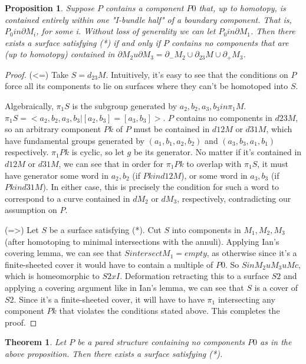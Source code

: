 \documentclass[12pt]{amsart}
\newtheorem{thm}[theorem]{Theorem}
\newtheorem{prop}[theorem]{Proposition}
\theoremstyle{definition}
\newcommand{\bd}{\partial}
\begin{document}
\begin{prop}

Suppose $P$ contains a component $P0$ that, up to homotopy, is
contained entirely within one "I-bundle half" of a boundary component. That is,
$P_0 in \bd M_i$, for some i. Without loss of generality we can let $P_0 in
\bd M_1$. Then
there exists a surface satisfying (*) if and only if $P$ contains no components
that are (up to homotopy) contained in $\bd M_2 u \bd M_3 = \bd_-M_2 \cup
\bd_{23}M \cup \bd_+M_3$.

\end{prop}
\begin{proof}

(<=) Take $S=d_{23}M$. Intuitively, it's easy to see that the conditions on
$P$ force all its components to lie on surfaces where they can't be homotoped
into $S$.

Algebraically, $\pi_1S$ is the subgroup generated by
$a_2,b_2,a_3,b_3 in \pi_1M$. $\pi_1S = <a_2,b_2,a_3,b_3 | [a_2,b_3]=[a_3,b_3]>$. $P$ contains no
components in $d23M$, so an arbitrary component $Pk$ of $P$  must be contained in
$d12M$ or $d31M$, which have fundamental groups generated by $(a_1,b_1,a_2,b_2)$ and
$(a_3,b_3,a_1,b_1)$ respectively. $\pi_1Pk$ is cyclic, so let $g$ be its generator. No
matter if it's contained in $d12M$ or $d31M$, we can see that in order for
$\pi_1Pk$ to
overlap with $\pi_1S$, it must have generator some word in $a_2,b_2$ (if $Pk in
d12M$),
or some word in $a_3,b_3$ (if $Pk in d31M$). In either case, this is precisely the
condition for such a word to correspond to a curve contained in $dM_2$ or $dM_3$,
respectively, contradicting our assumption on $P$.

(=>) Let $S$ be a surface satisfying (*). Cut $S$ into components in $M_1,M_2,M_3$
(after homotoping to minimal intersections with the annuli). Applying Ian's
covering lemma, we can see that $S intersect M_1 = empty$, as otherwise since it's
a finite-sheeted cover it would have to contain a multiple of $P0$.
So $S in M_2 u M_3 u Mc$, which is homeomorphic to $S2 x I$. Deformation retracting
this to a surface $S2$ and applying a covering argument like in Ian's lemma, we
can see that $S$ is a cover of $S2$. Since it's a finite-sheeted cover, it will
have to have $\pi_1$ intersecting any component $Pk$ that violates the conditions
stated above. This completes the proof.

\end{proof}

\begin{thm}

Let $P$ be a pared structure containing no components $P0$ as in the above
proposition. Then there exists a surface satisfying (*).

\end{thm}
\end{document}
